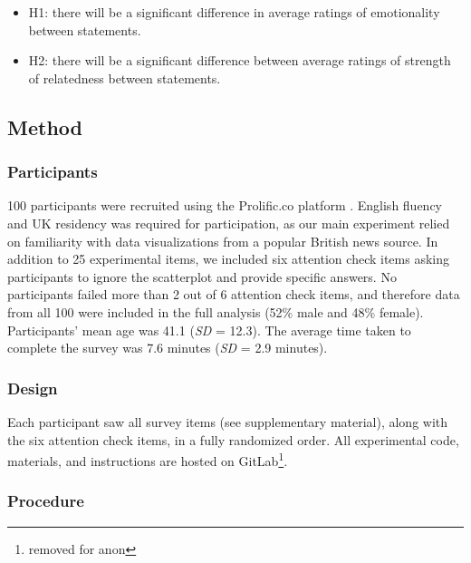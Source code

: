 \documentclass[manuscript,screen,review,anonymous]{acmart}
\providecommand{\tightlist}{%
  \setlength{\itemsep}{0pt}\setlength{\parskip}{0pt}}\usepackage{longtable,booktabs,array}
\begin{document}
\begin{itemize}
\tightlist
\item
  H1: there will be a significant difference in average ratings of
  emotionality between statements.
\item
  H2: there will be a significant difference between average ratings of
  strength of relatedness between statements.
\end{itemize}

\subsection{Method}\label{sec-method-pre}

\subsubsection{Participants}\label{sec-participants-pre}

100 participants were recruited using the Prolific.co platform
\citep{prolific}. English fluency and UK residency was required for
participation, as our main experiment relied on familiarity with data
visualizations from a popular British news source. In addition to 25
experimental items, we included six attention check items asking
participants to ignore the scatterplot and provide specific answers. No
participants failed more than 2 out of 6 attention check items, and
therefore data from all 100 were included in the full analysis (52\%
male and 48\% female). Participants' mean age was 41.1 (\emph{SD} =
12.3). The average time taken to complete the survey was 7.6 minutes
(\emph{SD} = 2.9 minutes).

\subsubsection{Design}\label{sec-design-pre}

Each participant saw all survey items (see supplementary material),
along with the six attention check items, in a fully randomized order.
All experimental code, materials, and instructions are hosted on
GitLab\footnote{removed for anon}.

\subsubsection{Procedure}\label{sec-procedure-pre}
\end{document}
